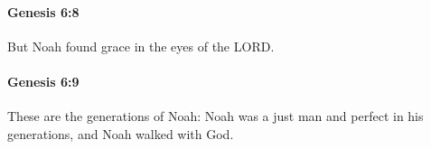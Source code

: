 		\paragraph{Genesis 6:8} %
			\label{GENESIS-6-8}

			But Noah found grace in the eyes of the LORD.


		\paragraph{Genesis 6:9} %
			\label{GENESIS-6-9}

			These are the generations of Noah: Noah was a just man and perfect in his generations, and Noah walked with God.


